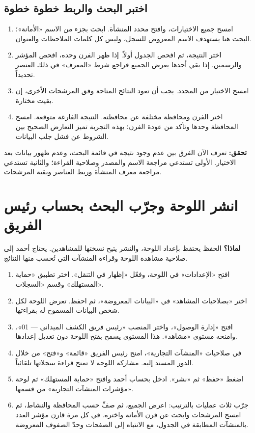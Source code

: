 \subsection{اختبر البحث والربط خطوة خطوة}

\begin{enumerate}
\item امسح جميع الاختيارات، وافتح محدد المنشأة. ابحث بجزء من الاسم «الأمانة»؛ البحث هنا يستهدف الاسم المعروض للسجل، وليس كل كلمات الملاحظات والعنوان.
\item اختر النتيجة، ثم افحص الجدول أولاً. إذا ظهر الفرن وحده، افحص المؤشر والرسمين. إذا بقي أحدها يعرض الجميع فراجع شرط «المعرف» في ذلك العنصر تحديداً.
\item امسح الاختيار من المحدد. يجب أن تعود النتائج المتاحة وفق المرشحات الأخرى، إن بقيت مختارة.
\item اختر الفرن ومحافظة مختلفة عن محافظته. النتيجة الفارغة متوقعة. امسح المحافظة وحدها وتأكد من عودة الفرن؛ بهذه التجربة تميز التعارض الصحيح بين الشروط عن فشل جلب البيانات.
\end{enumerate}

\textbf{تحقق:} تعرف الآن الفرق بين عدم وجود نتيجة في قائمة البحث، وعدم ظهور بيانات بعد الاختيار. الأولى تستدعي مراجعة الاسم والمصدر وصلاحية القراءة؛ والثانية تستدعي مراجعة معرف المنشأة وربط العناصر وبقية المرشحات.

\section{انشر اللوحة وجرّب البحث بحساب رئيس الفريق}
\label{sec:build-dashboard-publish}

\textbf{لماذا؟} الحفظ يحتفظ بإعداد اللوحة، والنشر يتيح نسختها للمشاهدين. يحتاج أحمد إلى صلاحية مشاهدة اللوحة وقراءة المنشآت التي تُحسب منها النتائج.

\begin{enumerate}
\item افتح «الإعدادات» في اللوحة، وفعّل «إظهار في التنقل». اختر تطبيق «حماية المستهلك» وقسم «السجلات».
\item اختر «بصلاحيات المشاهد» في «البيانات المعروضة»، ثم احفظ. تعرض اللوحة لكل شخص البيانات المسموح له بقراءتها.
\item افتح «إدارة الوصول»، واختر المنصب «رئيس فريق الكشف الميداني — 01»، وامنحه مستوى «مشاهد». هذا المستوى يسمح بفتح اللوحة دون تعديل إعدادها.
\item في صلاحيات «المنشآت التجارية»، امنح رئيس الفريق «قائمة» و«فتح» من خلال الدور المسند إليه. مشاركة اللوحة لا تمنح قراءة سجلاتها تلقائياً.
\item اضغط «حفظ» ثم «نشر». ادخل بحساب أحمد وافتح «حماية المستهلك» ثم لوحة «مؤشرات المنشآت التجارية» من قسمها.
\item جرّب ثلاث عمليات بالترتيب: اعرض الجميع، ثم صفِّ حسب المحافظة والنشاط، ثم امسح المرشحات وابحث عن فرن الأمانة واختره. في كل مرة قارن مؤشر العدد بالمنشآت المطابقة في الجدول، مع الانتباه إلى الصفحات وحدّ الصفوف المعروضة.
\end{enumerate}

